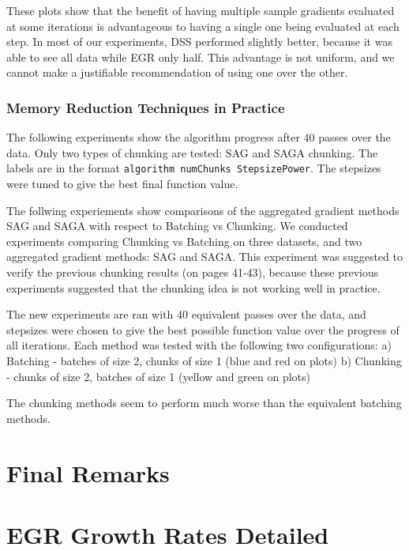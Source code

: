 \documentclass[11pt]{article}
\begin{document}
   These plots show that the benefit of having multiple sample gradients evaluated at some iterations is advantageous to having a single one being evaluated at each step. In most of our experiments, DSS performed slightly better, because it was able to see all data while EGR only half. This advantage is not uniform, and we cannot make a justifiable recommendation of using one over the other.
   
   \subsubsection{Memory Reduction Techniques in Practice}
   
   The following experiments show the algorithm progress after 40 passes over the data. Only two types of chunking are tested: SAG and SAGA chunking. The labels are in the format \texttt{algorithm numChunks StepsizePower}. The stepsizes were tuned to give the best final function value. 
   
   The follwing experiements show comparisons of the aggregated gradient methods SAG and SAGA with respect to Batching vs Chunking. We conducted experiments comparing Chunking vs Batching on three datasets, and two aggregated gradient methods: SAG and SAGA. This experiment was suggested to verify the previous chunking results (on pages 41-43), because these previous experiments suggested that the chunking idea is not working well in practice. 

   The new experiments are ran with 40 equivalent passes over the data, and stepsizes were chosen to give the best possible function value over the progress of all iterations. Each method was tested with the following two configurations:
   a) Batching - batches of size 2, chunks of size 1  (blue and red on plots)
   b) Chunking - chunks of size 2, batches of size 1 (yellow and green on plots)

   The chunking methods seem to perform much worse than the equivalent batching methods.

\section{Final Remarks} \label{finalr}


 \small 




\appendix 

\section{EGR Growth Rates Detailed} \label{appendix:EGRGrowthRatesDetailed}
   
\end{document}
